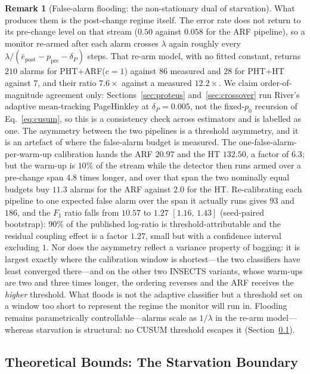 \documentclass[10pt,conference]{IEEEtran}
\theoremstyle{definition}
\newtheorem{remark}[theorem]{Remark}
\newcommand{\FloodLamArf}{20.97}             %
\newcommand{\FloodLamHt}{132.50}             %
\newcommand{\FloodPredArf}{210}              %
\newcommand{\FloodPredHt}{28}                %
\newcommand{\SpanOverWarm}{4.8}              %
\newcommand{\LamEqArf}{93}                   %
\newcommand{\LamEqHt}{186}                   %
\newcommand{\FaSpanArf}{11.3}                %
\newcommand{\FaSpanHt}{2.0}                  %
\newcommand{\RhoRefMeas}{10.57}              %
\newcommand{\RhoEqSpan}{1.27}                %
\newcommand{\RhoEqSpanCI}{[1.16,\,1.43]}     %
\newcommand{\ThresholdShare}{90}             %
\begin{document}
\begin{remark}[False-alarm flooding: the non-stationary dual of starvation]
  What produces them is the post-change regime itself. The error rate does not return to its pre-change level on that stream ($0.50$ against $0.058$ for the ARF pipeline), so a monitor re-armed after each alarm crosses $\lambda$ again roughly every $\lambda / (\bar e_{\mathrm{post}} - p_{\mathrm{pre}} - \delta_P)$ steps. That re-arm model, with no fitted constant, returns $\FloodPredArf$ alarms for PHT$+$ARF($c{=}1$) against $86$ measured and $\FloodPredHt$ for PHT$+$HT against $7$, and their ratio $7.6\times$ against a measured $12.2\times$. We claim order-of-magnitude agreement only: Sections~\ref{sec:proteus} and~\ref{sec:crossover} run River's adaptive mean-tracking PageHinkley at $\delta_P = 0.005$, not the fixed-$p_0$ recursion of Eq.~\eqref{eq:cusum}, so this is a consistency check across estimators and is labelled as one. The asymmetry between the two pipelines is a threshold asymmetry, and it is an artefact of where the false-alarm budget is measured. The one-false-alarm-per-warm-up calibration hands the ARF $\FloodLamArf$ and the HT $\FloodLamHt$, a factor of $6.3$; but the warm-up is $10\%$ of the stream while the detector then runs armed over a pre-change span $\SpanOverWarm$ times longer, and over that span the two nominally equal budgets buy $\FaSpanArf$ alarms for the ARF against $\FaSpanHt$ for the HT. Re-calibrating each pipeline to one expected false alarm over the span it actually runs gives $\LamEqArf$ and $\LamEqHt$, and the $F_1$ ratio falls from $\RhoRefMeas$ to $\RhoEqSpan$ $\RhoEqSpanCI$ (seed-paired bootstrap): $\ThresholdShare\%$ of the published log-ratio is threshold-attributable and the residual coupling effect is a factor $\RhoEqSpan$, small but with a confidence interval excluding $1$. Nor does the asymmetry reflect a variance property of bagging: it is largest exactly where the calibration window is shortest---the two classifiers have least converged there---and on the other two INSECTS variants, whose warm-ups are two and three times longer, the ordering reverses and the ARF receives the \emph{higher} threshold. What floods is not the adaptive classifier but a threshold set on a window too short to represent the regime the monitor will run in. Flooding remains parametrically controllable---alarms scale as $1/\lambda$ in the re-arm model---whereas starvation is structural: no CUSUM threshold escapes it (Section~\ref{sec:starvation_boundary}).
\end{remark}

\subsection{Theoretical Bounds: The Starvation Boundary}\label{sec:starvation_boundary}
\end{document}
